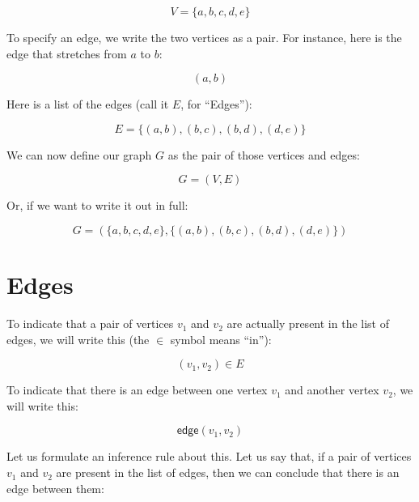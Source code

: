 \documentclass[../../../main.tex]{subfiles}
\begin{document}
\begin{equation}
V = \{a , b, c, d, e \}
\end{equation}

\noindent
To specify an edge, we write the two vertices as a pair. For instance, here is the edge that stretches from $a$ to $b$:

\begin{equation}
(a, b)
\end{equation}

\noindent
Here is a list of the edges (call it $E$, for ``Edges''):

\begin{equation}
E = \{ (a, b), (b, c), (b, d), (d, e) \}
\end{equation}

\noindent
We can now define our graph $G$ as the pair of those vertices and edges:

\begin{equation}
G = (V, E)
\end{equation}

\noindent
Or, if we want to write it out in full:

\begin{equation}
G = (\{a , b, c, d, e \}, \{ (a, b), (b, c), (b, d), (d, e) \})
\end{equation}



\section{Edges}

To indicate that a pair of vertices $v_{1}$ and $v_{2}$ are actually present in the list of edges, we will write this (the $\in$ symbol means ``in''):

\begin{equation}
(v_{1}, v_{2}) \in E
\end{equation}

\noindent
To indicate that there is an edge between one vertex $v_{1}$ and another vertex $v_{2}$, we will write this:

\begin{equation}
\mathsf{edge}(v_{1}, v_{2})
\end{equation}

\noindent
Let us formulate an inference rule about this. Let us say that, if a pair of vertices $v_{1}$ and $v_{2}$ are present in the list of edges, then we can conclude that there is an edge between them:
\end{document}
